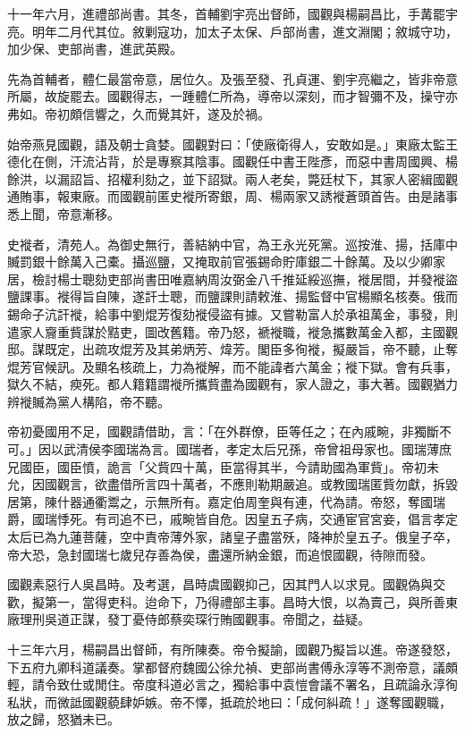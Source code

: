 \begin{pinyinscope}
十一年六月，進禮部尚書。其冬，首輔劉宇亮出督師，國觀與楊嗣昌比，手冓罷宇亮。明年二月代其位。敘剿寇功，加太子太保、戶部尚書，進文淵閣；敘城守功，加少保、吏部尚書，進武英殿。

先為首輔者，體仁最當帝意，居位久。及張至發、孔貞運、劉宇亮繼之，皆非帝意所屬，故旋罷去。國觀得志，一踵體仁所為，導帝以深刻，而才智彌不及，操守亦弗如。帝初頗信響之，久而覺其奸，遂及於禍。

始帝燕見國觀，語及朝士貪婪。國觀對曰：「使廠衛得人，安敢如是。」東廠太監王德化在側，汗流沾背，於是專察其陰事。國觀任中書王陛彥，而惡中書周國興、楊餘洪，以漏詔旨、招權利劾之，並下詔獄。兩人老矣，斃廷杖下，其家人密緝國觀通賄事，報東廠。而國觀前匿史褷所寄銀，周、楊兩家又誘褷蒼頭首告。由是諸事悉上聞，帝意漸移。

史褷者，清苑人。為御史無行，善結納中官，為王永光死黨。巡按淮、揚，括庫中贓罰銀十餘萬入己橐。攝巡鹽，又掩取前官張錫命貯庫銀二十餘萬。及以少卿家居，檢討楊士聰劾吏部尚書田唯嘉納周汝弼金八千推延綏巡撫，褷居間，并發褷盜鹽課事。褷得旨自陳，遂訐士聰，而鹽課則請敕淮、揚監督中官楊顯名核奏。俄而錫命子沆訐褷，給事中劉焜芳復劾褷侵盜有據。又嘗勒富人於承祖萬金，事發，則遣家人齎重貲謀於黠吏，圖改舊籍。帝乃怒，褫褷職，褷急攜數萬金入都，主國觀邸。謀既定，出疏攻焜芳及其弟炳芳、煒芳。閣臣多徇褷，擬嚴旨，帝不聽，止奪焜芳官候訊。及顯名核疏上，力為褷解，而不能諱者六萬金；褷下獄。會有兵事，獄久不結，瘐死。都人籍籍謂褷所攜貲盡為國觀有，家人證之，事大著。國觀猶力辨褷贓為黨人構陷，帝不聽。

帝初憂國用不足，國觀請借助，言：「在外群僚，臣等任之；在內戚畹，非獨斷不可。」因以武清侯李國瑞為言。國瑞者，孝定太后兄孫，帝曾祖母家也。國瑞薄庶兄國臣，國臣憤，詭言「父貲四十萬，臣當得其半，今請助國為軍貲」。帝初未允，因國觀言，欲盡借所言四十萬者，不應則勒期嚴追。或教國瑞匿貲勿獻，拆毀居第，陳什器通衢鬻之，示無所有。嘉定伯周奎與有連，代為請。帝怒，奪國瑞爵，國瑞悸死。有司追不已，戚畹皆自危。因皇五子病，交通宦官宮妾，倡言孝定太后已為九蓮菩薩，空中責帝薄外家，諸皇子盡當殀，降神於皇五子。俄皇子卒，帝大恐，急封國瑞七歲兒存善為侯，盡還所納金銀，而追恨國觀，待隙而發。

國觀素惡行人吳昌時。及考選，昌時虞國觀抑己，因其門人以求見。國觀偽與交歡，擬第一，當得吏科。迨命下，乃得禮部主事。昌時大恨，以為賣己，與所善東廠理刑吳道正謀，發丁憂侍郎蔡奕琛行賄國觀事。帝聞之，益疑。

十三年六月，楊嗣昌出督師，有所陳奏。帝令擬諭，國觀乃擬旨以進。帝遂發怒，下五府九卿科道議奏。掌都督府魏國公徐允禎、吏部尚書傅永淳等不測帝意，議頗輕，請令致仕或閒住。帝度科道必言之，獨給事中袁愷會議不署名，且疏論永淳徇私狀，而微詆國觀藐肆妒嫉。帝不懌，抵疏於地曰：「成何糾疏！」遂奪國觀職，放之歸，怒猶未已。


\end{pinyinscope}
